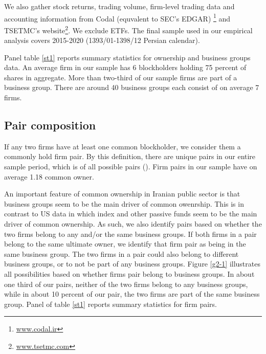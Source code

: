 	We also gather stock returns, trading volume, firm-level trading data and accounting information from Codal (equvalent to SEC's EDGAR) \footnote{\href{http://www.codal.ir}{www.codal.ir}}
and TSETMC's website\footnote{\href{http://www.tsetmc.com}{www.tsetmc.com}}. We exclude ETFs. The final sample used in our empirical analysis covers 2015-2020 (1393/01-1398/12 Persian calendar). 



Panel  table \ref{st1} reports summary statistics for ownership and business groups data. An average firm in our sample has 6 blockholders holding 75 percent of shares in aggregate. More than two-third of our sample firms are part of a business group. There are around 40 business groups each consist of on average 7 firms.






\subsection{{Pair composition} }

	If any two firms have at least one common blockholder, we consider them a commonly hold firm pair. By this definition, there are   unique pairs in our entire sample period, which is of all possible pairs (). Firm pairs in our sample have on average 1.18 common owner. 
	
	
	\normalcolor
	
	An important feature of common ownership in Iranian public sector is that business groups seem to be the main driver of common owenrship. This is in contrast to US data in which index and other passive funds seem to be the main driver of common ownership. As such, we also identify pairs based on whether the two firms belong to any and/or the same business groups. 
	If both firms in a pair belong to the same ultimate owner, we identify that firm pair as being in the same business group. The two firms in a pair could also belong to different business groups, or to not be part of any business groups. Figure \ref{g2-1} illustrates all possibilities based on whether firms pair belong to business groups. In about one third of our pairs, neither of the two firms belong to any business groups, while in about 10 percent of our pair, the two firms are part of the same business group. Panel  of table \ref{st1} reports summary statistics for firm pairs.
	
